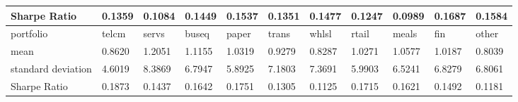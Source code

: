 \documentclass{report}
\begin{document}
\begin{table}[H]
\begin{tabular}{@{}|l|llllllllll@{}}
Sharpe Ratio       & 0.1359                     & 0.1084                     & 0.1449                     & 0.1537                     & 0.1351                     & 0.1477                     & 0.1247                     & 0.0989                     & 0.1687                     & 0.1584                     \\ \midrule
portfolio          & \multicolumn{1}{l|}{telcm} & \multicolumn{1}{l|}{servs} & \multicolumn{1}{l|}{buseq} & \multicolumn{1}{l|}{paper} & \multicolumn{1}{l|}{trans} & \multicolumn{1}{l|}{whlsl} & \multicolumn{1}{l|}{rtail} & \multicolumn{1}{l|}{meals} & \multicolumn{1}{l|}{fin}   & \multicolumn{1}{l|}{other} \\ \midrule
mean               & 0.8620                     & 1.2051                     & 1.1155                     & 1.0319                     & 0.9279                     & 0.8287                     & 1.0271                     & 1.0577                     & 1.0187                     & 0.8039                     \\ \cmidrule(r){1-1}
standard deviation & 4.6019                     & 8.3869                     & 6.7947                     & 5.8925                     & 7.1803                     & 7.3691                     & 5.9903                     & 6.5241                     & 6.8279                     & 6.8061                     \\ \cmidrule(r){1-1}
Sharpe Ratio       & 0.1873                     & 0.1437                     & 0.1642                     & 0.1751                     & 0.1305                     & 0.1125                     & 0.1715                     & 0.1621                     & 0.1492                     & 0.1181                     \\ \bottomrule
\end{tabular}
\end{table}
\end{document}
